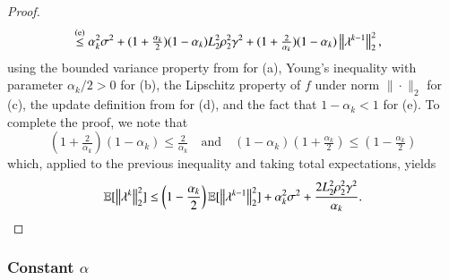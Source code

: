 \begin{toappendix}
\begin{proof}
\begin{equation*}
\begin{aligned}
                 &\stackrel{\text{(e)}}{\leq} \alpha_k^2\sigma^2 + (1+\tfrac{\alpha_k}{2})(1-\alpha_k)L_2^2\rho_2^2\gamma^2 + (1+\tfrac{2}{\alpha_k})(1-\alpha_k)\left\Vert{\lambda^{k-1}}\right\Vert_2^2,
        \end{aligned}
    \end{equation*}
    using the bounded variance property from  for (a), Young's inequality with parameter $\alpha_k/2>0$ for (b), the Lipschitz property of $f$ under norm $\|\cdot\|_2$ for (c), the update definition from  for (d), and the fact that $1-\alpha_k < 1$ for (e).
    To complete the proof, we note that
    \begin{equation*}
        (1+\tfrac{2}{\alpha_k})(1-\alpha_k)\leq \tfrac{2}{\alpha_k}\quad\text{and}\quad(1-\alpha_k)(1+\tfrac{\alpha_k}{2})\leq (1-\tfrac{\alpha_k}{2})
    \end{equation*}
    which, applied to the previous inequality and taking total expectations, yields
    \begin{equation*}
        \mathbb{E}[\left\Vert{\lambda^k}\right\Vert_2^2] \leq \left(1-\frac{\alpha_k}{2}\right)\mathbb{E}[\left\Vert{\lambda^{k-1}}\right\Vert_2^2] + \alpha_k^2\sigma^2 + \frac{2L_2^2\rho_2^2\gamma^2}{\alpha_k}.
    \end{equation*}
\end{proof}

\subsubsection{Constant $\alpha$}


\end{toappendix}
